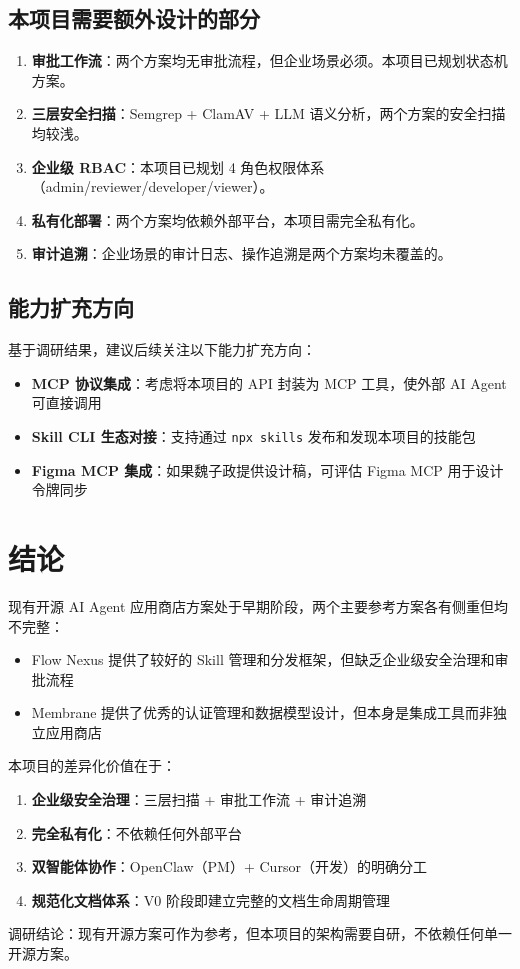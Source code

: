 \documentclass[11pt,a4paper]{article}
\begin{document}
\subsection{本项目需要额外设计的部分}

\begin{enumerate}
  \item \textbf{审批工作流}：两个方案均无审批流程，但企业场景必须。本项目已规划状态机方案。
  
  \item \textbf{三层安全扫描}：Semgrep + ClamAV + LLM 语义分析，两个方案的安全扫描均较浅。
  
  \item \textbf{企业级 RBAC}：本项目已规划 4 角色权限体系（admin/reviewer/developer/viewer）。
  
  \item \textbf{私有化部署}：两个方案均依赖外部平台，本项目需完全私有化。
  
  \item \textbf{审计追溯}：企业场景的审计日志、操作追溯是两个方案均未覆盖的。
\end{enumerate}

\subsection{能力扩充方向}
基于调研结果，建议后续关注以下能力扩充方向：
\begin{itemize}
  \item \textbf{MCP 协议集成}：考虑将本项目的 API 封装为 MCP 工具，使外部 AI Agent 可直接调用
  \item \textbf{Skill CLI 生态对接}：支持通过 \texttt{npx skills} 发布和发现本项目的技能包
  \item \textbf{Figma MCP 集成}：如果魏子政提供设计稿，可评估 Figma MCP 用于设计令牌同步
\end{itemize}

\section{结论}

现有开源 AI Agent 应用商店方案处于早期阶段，两个主要参考方案各有侧重但均不完整：
\begin{itemize}
  \item Flow Nexus 提供了较好的 Skill 管理和分发框架，但缺乏企业级安全治理和审批流程
  \item Membrane 提供了优秀的认证管理和数据模型设计，但本身是集成工具而非独立应用商店
\end{itemize}

本项目的差异化价值在于：
\begin{enumerate}
  \item \textbf{企业级安全治理}：三层扫描 + 审批工作流 + 审计追溯
  \item \textbf{完全私有化}：不依赖任何外部平台
  \item \textbf{双智能体协作}：OpenClaw（PM）+ Cursor（开发）的明确分工
  \item \textbf{规范化文档体系}：V0 阶段即建立完整的文档生命周期管理
\end{enumerate}

调研结论：现有开源方案可作为参考，但本项目的架构需要自研，不依赖任何单一开源方案。
\end{document}
